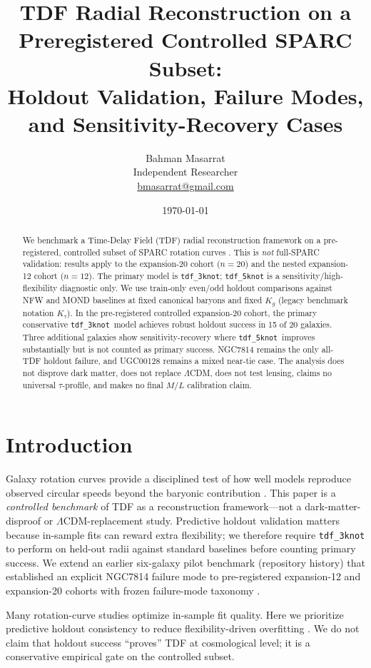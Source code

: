 \documentclass[11pt,a4paper]{article}
\title{TDF Radial Reconstruction on a Preregistered Controlled SPARC Subset:\\
Holdout Validation, Failure Modes, and Sensitivity-Recovery Cases}
\author{Bahman Masarrat\\
Independent Researcher\\
\href{mailto:bmasarrat@gmail.com}{bmasarrat@gmail.com}}
\date{\today}
\begin{document}
\maketitle

\begin{abstract}
We benchmark a Time-Delay Field (TDF) radial reconstruction framework on a pre-registered,
controlled subset of SPARC rotation curves \cite{lelli2016sparc}. This is \emph{not}
full-SPARC validation: results apply to the expansion-20 cohort ($n{=}20$) and the nested
expansion-12 cohort ($n{=}12$). The primary model is \texttt{tdf\_3knot};
\texttt{tdf\_5knot} is a sensitivity/high-flexibility diagnostic only. We use train-only
even/odd holdout comparisons against NFW \cite{navarro1997} and MOND \cite{milgrom1983}
baselines at fixed canonical baryons and fixed $K_g$ (legacy benchmark notation $K_\tau$). In the pre-registered controlled expansion-20 cohort, the primary conservative \texttt{tdf\_3knot}\  model achieves robust holdout success in 15 of 20 galaxies. Three additional galaxies show sensitivity-recovery where \texttt{tdf\_5knot}\  improves substantially but is not counted as primary success. NGC7814 remains the only all-TDF holdout failure, and UGC00128 remains a mixed near-tie case. The analysis does not
disprove dark matter, does not replace $\Lambda$CDM, does not test lensing, claims no
universal $\tau$-profile, and makes no final $M/L$ calibration claim.
\end{abstract}

\section{Introduction}
Galaxy rotation curves provide a disciplined test of how well models reproduce observed
circular speeds beyond the baryonic contribution \cite{lelli2016sparc}. This paper is a
\emph{controlled benchmark} of TDF as a reconstruction framework---not a dark-matter-disproof
or $\Lambda$CDM-replacement study. Predictive holdout validation matters because in-sample
fits can reward extra flexibility; we therefore require \texttt{tdf\_3knot} to perform on
held-out radii against standard baselines before counting primary success. We extend an earlier six-galaxy pilot benchmark (repository history) that established an
explicit NGC7814 failure mode to pre-registered expansion-12 and expansion-20 cohorts with
frozen failure-mode taxonomy \cite{tdf_benchmark2026}.

Many rotation-curve studies optimize in-sample fit quality. Here we prioritize predictive
holdout consistency to reduce flexibility-driven overfitting \cite{geisser1975,arlot2010}.
We do not claim that holdout success ``proves'' TDF at cosmological level; it is a conservative
empirical gate on the controlled subset.
\end{document}
